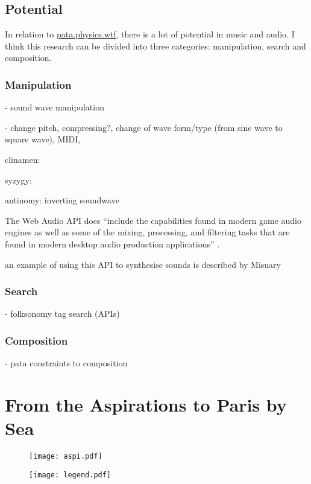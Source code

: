 \subsection{Potential}
\label{s:potential}

In relation to \url{pata.physics.wtf}, there is a lot of potential in music and audio. I think this research can be divided into three categories: manipulation, search and composition.

\subsubsection{Manipulation}

- sound wave manipulation

- change pitch, compressing?, change of wave form/type (from sine wave to square wave), MIDI,  

clinamen:

syzygy:

antinomy: inverting soundwave



The Web Audio API does ``include the capabilities found in modern game audio engines as well as some of the mixing, processing, and filtering tasks that are found in modern desktop audio production applications'' \autocite{Adenot2017}.

an example of using this API to synthesise sounds is described by Misuary \autocite{Misuary2016}



\autocite{soundcloud}




\subsubsection{Search}

- folksonomy tag search (APIs)


\subsubsection{Composition}

- pata constraints to composition




\section{From the Aspirations to Paris by Sea}

\begin{figure}[!htb]
\centering
  \texttt{[image: aspi.pdf]}
\end{figure}



\begin{figure}[!htb]
\centering
  \texttt{[image: legend.pdf]}
\end{figure}

\stopcontents[chapters]
